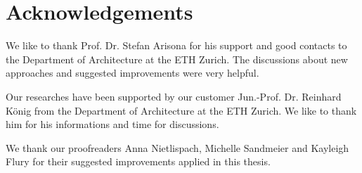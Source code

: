 \section{Acknowledgements}

We like to thank Prof. Dr. Stefan Arisona for his support and good contacts to the Department of Architecture at the ETH Zurich. The discussions about new approaches and suggested improvements were very helpful.

Our researches have been supported by our customer Jun.-Prof. Dr. Reinhard König from the Department of Architecture at the ETH Zurich. We like to thank him for his informations and time for discussions.

We thank our proofreaders Anna Nietlispach, Michelle Sandmeier and Kayleigh Flury for their suggested improvements applied in this thesis.